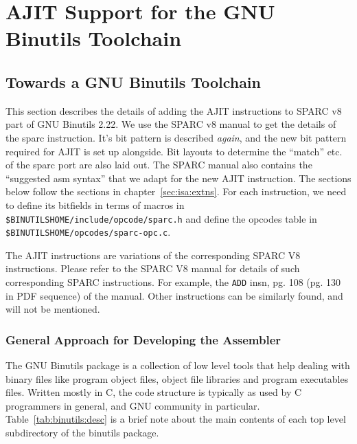 \chapter{AJIT Support for the GNU Binutils Toolchain}
\label{chap:amv:work}

\section{Towards a GNU Binutils Toolchain}
\label{sec:binutils:support}

This section describes the details  of adding the AJIT instructions to
SPARC v8 part of GNU Binutils 2.22.  We use the SPARC v8 manual to get
the details of  the sparc instruction.  It's bit  pattern is described
\emph{again}, and  the new  bit pattern  required for  AJIT is  set up
alongside.  Bit layouts to determine  the ``match'' etc.  of the sparc
port  are  also  laid  out.    The  SPARC  manual  also  contains  the
``suggested asm syntax''  that we adapt for the  new AJIT instruction.
The sections below follow the sections in chapter~\ref{sec:isa:extns}.
For each  instruction, we  need to  define its  bitfields in  terms of
macros  in  \texttt{\$BINUTILSHOME/include/opcode/sparc.h} and  define
the opcodes table in \texttt{\$BINUTILSHOME/opcodes/sparc-opc.c}.

The AJIT  instructions are  variations of  the corresponding  SPARC V8
instructions.  Please refer to the SPARC V8 manual for details of such
corresponding SPARC instructions. For  example, the \texttt{ADD} insn,
pg. 108 (pg.  130 in PDF  sequence) of the manual.  Other instructions
can be similarly found, and will not be mentioned.

\subsection{General Approach for Developing the Assembler}
\label{sec:general:approach}

The GNU Binutils package is a  collection of low level tools that help
dealing  with binary  files  like program  object  files, object  file
libraries and  program executables  files.  Written  mostly in  C, the
code structure is  typically as used by C programmers  in general, and
GNU community in particular.  Table~\ref{tab:binutils:desc} is a brief
note about  the main contents  of each  top level subdirectory  of the
binutils package.

